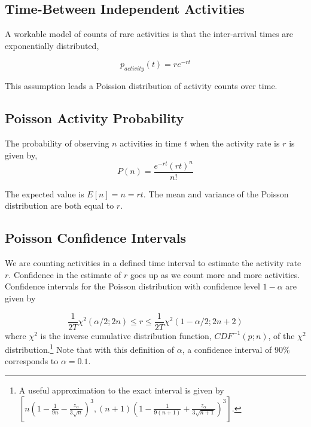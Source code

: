 \documentclass{article}
\begin{document}
\subsection{Time-Between Independent Activities} 

A workable model of counts of rare activities is that the inter-arrival times are exponentially distributed, 

\begin{equation}
    \label{eq:tbe}
    p_{activity}(t) = r e^{-r t}
\end{equation}

This assumption leads a Poission distribution of activity counts over time.

\subsection{Poisson Activity Probability} 

The probability of observing $n$ activities in time $t$ when the activity rate is $r$ is given by,
\begin{equation}
    \label{eq:poisson}
    P(n) = \frac{e^{-r t} (r t)^n}{n!}
\end{equation}

The expected value is $E[n]=n=rt$. The mean and variance of the Poisson distribution are both equal to $r$.

\subsection{Poisson Confidence Intervals} 

We are counting activities in a defined time interval to estimate the activity rate $r$.  Confidence in the estimate of $r$ goes up as we count more and more activities. Confidence intervals for the Poisson distribution with confidence level $1-\alpha$ are given by

\begin{equation}
    \label{eq:chisqconf}
    \frac{1}{2T} \chi^2(\alpha/2;2n) \leq r \leq \frac{1}{2T} \chi^2(1-\alpha/2;2n+2)
\end{equation}
where $\chi^2$ is the inverse cumulative distribution function, $CDF^{-1}(p; n)$, of the $\chi^2$ distribution.\footnote{A useful approximation to the exact interval is given by  $[ n(1 - \frac{1}{9n} - \frac{z_{\alpha}}{3\sqrt{n}})^3 , (n+1)(1- \frac{1}{9(n+1)} + \frac{z_{\alpha}}{3\sqrt{n+1}})^3]$. }
Note that with this definition of $\alpha$, a confidence interval of 90\% corresponds to $\alpha=0.1$.
\end{document}

